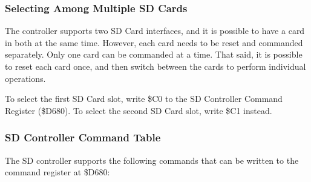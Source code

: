 \begin{enumerate}
\subsubsection{Selecting Among Multiple SD Cards}

The controller supports two SD Card interfaces, and it is possible to
have a card in both at the same time.  However, each card needs to be
reset and commanded separately.  Only one card can be commanded at a
time.  That said, it is possible to reset each card once, and then
switch between the cards to perform individual operations.

To select the first SD Card slot, write \$C0 to the SD Controller
Command Register (\$D680).  To select the second SD Card slot, write
\$C1 instead.

\subsubsection{SD Controller Command Table}

The SD controller supports the following commands that can be written
to the command register at \$D680:


\end{enumerate}
